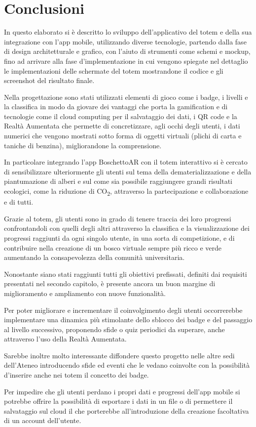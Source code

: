 \chapter{Conclusioni}
In questo elaborato si è descritto lo sviluppo dell'applicativo del totem e della sua integrazione con l'app mobile, utilizzando diverse tecnologie, partendo dalla fase di design architetturale e grafico, con l'aiuto di strumenti come schemi e mockup, fino ad arrivare alla fase d'implementazione in cui vengono spiegate nel dettaglio le implementazioni delle schermate del totem mostrandone il codice e gli screenshot del risultato finale.

Nella progettazione sono stati utilizzati elementi di gioco come i badge, i livelli e la classifica in modo da giovare dei vantaggi che porta la gamification e di tecnologie come il cloud computing per il salvataggio dei dati, i QR code e la Realtà Aumentata che permette di concretizzare, agli occhi degli utenti, i dati numerici che vengono mostrati sotto forma di oggetti virtuali (plichi di carta e taniche di benzina), migliorandone la comprensione.

In particolare integrando l'app BoschettoAR con il totem interattivo si è cercato di sensibilizzare ulteriormente gli utenti sul tema della dematerializzazione e della piantumazione di alberi e sul come sia possibile raggiungere grandi risultati ecologici, come la riduzione di CO\textsubscript{2}, attraverso la partecipazione e collaborazione e di tutti.

Grazie al totem, gli utenti sono in grado di tenere traccia dei loro progressi confrontandoli con quelli degli altri attraverso la classifica e la visualizzazione dei progressi raggiunti da ogni singolo utente, in una sorta di competizione, e di contribuire nella creazione di un bosco virtuale sempre più ricco e verde aumentando la consapevolezza della comunità universitaria.

Nonostante siano stati raggiunti tutti gli obiettivi prefissati, definiti dai requisiti presentati nel secondo capitolo, è presente ancora un buon margine di miglioramento e ampliamento con nuove funzionalità.

Per poter migliorare e incrementare il coinvolgimento degli utenti occorrerebbe implementare una dinamica più stimolante dello sblocco dei badge e del passaggio al livello successivo, proponendo sfide o quiz periodici da superare, anche attraverso l'uso della Realtà Aumentata.

Sarebbe inoltre molto interessante diffondere questo progetto nelle altre sedi dell'Ateneo introducendo sfide ed eventi che le vedano coinvolte con la possibilità d'inserire anche nei totem il concetto dei badge.

Per impedire che gli utenti perdano i propri dati e progressi dell'app mobile si potrebbe offrire la possibilità di esportare i dati in un file o di permettere il salvataggio sul cloud il che porterebbe all'introduzione della creazione facoltativa di un account dell'utente.